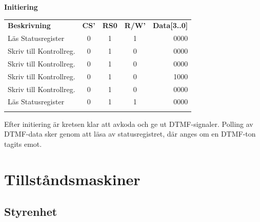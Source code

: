 \documentclass[a4paper,11pt]{article}
\begin{document}
	{\bf Initiering}

	\begin{tabular}{l c c c r}
		\\{\bf Beskrivning} & {\bf CS'} & {\bf RS0} & {\bf R/W'} & {\bf Data[3..0]}\\
		Läs Statusregister 	& 0 & 1 & 1 & 0000\\
		Skriv till Kontrollreg. & 0 & 1 & 0 & 0000\\
		Skriv till Kontrollreg. & 0 & 1 & 0 & 0000\\
		Skriv till Kontrollreg. & 0 & 1 & 0 & 1000\\
		Skriv till Kontrollreg. & 0 & 1 & 0 & 0000\\
		Läs Statusregister 	& 0 & 1 & 1 & 0000\\\\
	\end{tabular}
	
	Efter initiering är kretsen klar att avkoda och ge ut DTMF-signaler. Polling av DTMF-data sker genom
	att läsa av statusregistret, där anges om en DTMF-ton tagits emot.

\section{Tillståndsmaskiner}
		\subsection{Styrenhet}
\end{document}
